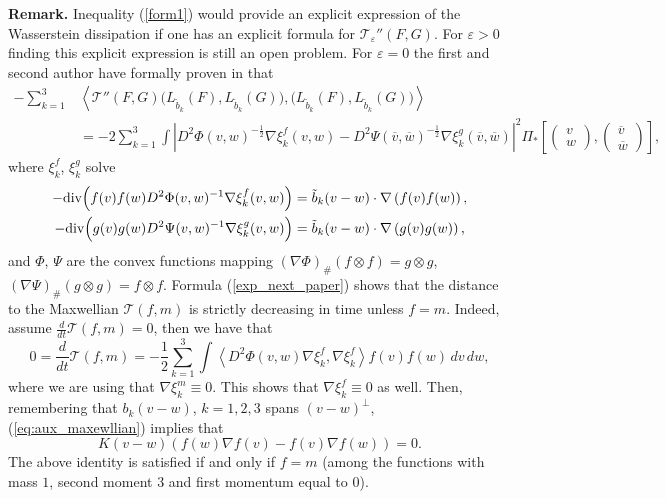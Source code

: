 \documentclass[11pt]{amsart}
\numberwithin{equation}{section}
\begin{document}
\textbf{Remark.}
Inequality (\ref{form1}) would provide an explicit expression of the Wasserstein dissipation if one has an explicit formula for $\mathcal T_\varepsilon''(F,G)$.  For $\varepsilon >0$ finding this explicit expression is still an open problem. For $\varepsilon =0$ the first and second author  have formally proven in  \cite{CD25} that 
\begin{align}
   -\sum_{k=1}^{3} &\left\langle \mathcal T''(F,G)\big(L_{\tilde{b}_{k}}(F),L_{\tilde{b}_{k}}(G)\big),\big(L_{\tilde{b}_{k}}(F),L_{\tilde{b}_{k}}(G)\big)\right\rangle	\nonumber\\
    & =-2\sum_{k=1}^{3}\int\left | D^{2}\Phi(v,w)^{-\frac12}\nabla \xi^f_{k}(v,w)-D^{2}\Psi(\overline{v},\overline{w})^{-\frac12}\nabla \xi^g_{k}(\overline{v},\overline{w})\right |^2  
    \Pi_{*}\left[\begin{pmatrix}v\\w\end{pmatrix},\begin{pmatrix}\overline{v}\\\overline{w}\end{pmatrix}\right],\label{exp_next_paper}
  \end{align}
  where $\xi_k^f$, $\xi_k^g$ solve
  \begin{align}
    -\textnormal{div}\Big(f(v)f(w)D^{2}\Phi(v,w)^{-1}\nabla \xi_{k}^{f}(v,w)\Big) &
    =\tilde{b}_{k}(v-w)\cdot\nabla\left(f(v)f(w)\right), \label{eq:aux_maxewllian}	\\
    -\textnormal{div}\Big(g(v)g(w)D^{2}\Psi(v,w)^{-1}\nabla \xi_{k}^{g}(v,w)\Big)&
    =\tilde{b}_{k}(v-w)\cdot\nabla\left(g(v)g(w)\right), \nonumber
  \end{align}
  and $\Phi$, $\Psi$ are the convex functions mapping $(\nabla\Phi)_\#(f\otimes f) = g\otimes g$, $(\nabla \Psi)_\#(g\otimes g) = f\otimes f$. Formula (\ref{exp_next_paper})  shows that the distance to the Maxwellian $\mathcal T(f,m)$ is strictly decreasing in time unless $f=m$. Indeed, assume $\frac{d}{dt}\mathcal T (f,m) = 0$, then we have that
  $$
  0=\frac{d}{dt} \mathcal T(f,m) = - \frac{1}{2} \sum_{k=1}^3
  \int \left\langle D^2\Phi(v,w)\nabla \xi_k^f, \nabla \xi_k^f  \right\rangle f(v)f(w) \,dv\,dw,
  $$
  where we are using that $\nabla \xi_k^m \equiv 0$. This shows that $\nabla \xi_k^f \equiv 0$ as well. Then, remembering that $b_k(v-w)$, $k=1,2,3$ spans $(v-w)^\perp$, (\ref{eq:aux_maxewllian}) implies that
  $$
  K(v-w)(f(w)\nabla f(v) - f(v)\nabla f(w)) = 0. 
  $$
  The above identity is satisfied if and only if $ f =m$ (among the functions with mass $1$, second moment $3$ and first momentum equal to $0$).
  
\end{document}
